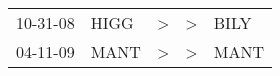 \begin{supertabular}{lllll}
 10-31-08 &  HIGG &  \textgreater &  \textgreater &  BILY \\
 04-11-09 &  MANT &  \textgreater &  \textgreater &  MANT \\
\end{supertabular}
